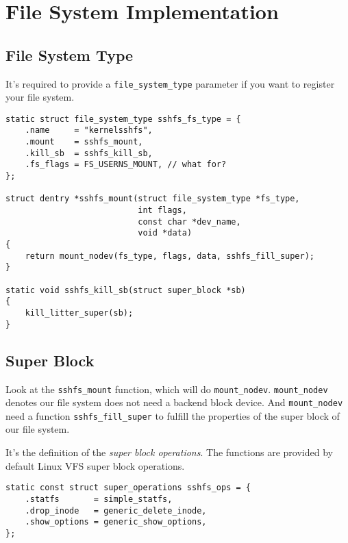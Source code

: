\section{File System Implementation}

\subsection{File System Type}
It's required to provide a \lstinline{file_system_type} parameter if you want to register your file system.\\

\begin{lstlisting}
static struct file_system_type sshfs_fs_type = {
    .name     = "kernelsshfs",
    .mount    = sshfs_mount,
    .kill_sb  = sshfs_kill_sb,
    .fs_flags = FS_USERNS_MOUNT, // what for?
};

struct dentry *sshfs_mount(struct file_system_type *fs_type,
                           int flags,
                           const char *dev_name,
                           void *data)
{
    return mount_nodev(fs_type, flags, data, sshfs_fill_super);
}

static void sshfs_kill_sb(struct super_block *sb)
{
    kill_litter_super(sb);
}
\end{lstlisting}

\subsection{Super Block}

Look at the \lstinline{sshfs_mount} function, which will do \lstinline{mount_nodev}. \lstinline{mount_nodev} denotes our file system does not need a backend block device. And \lstinline{mount_nodev} need a function \lstinline{sshfs_fill_super} to fulfill the properties of the super block of our file system.

It's the definition of the \emph{super block operations}. The functions are provided by default Linux VFS super block operations.
\begin{lstlisting}
static const struct super_operations sshfs_ops = {
    .statfs       = simple_statfs,
    .drop_inode   = generic_delete_inode,
    .show_options = generic_show_options,
};
\end{lstlisting}


